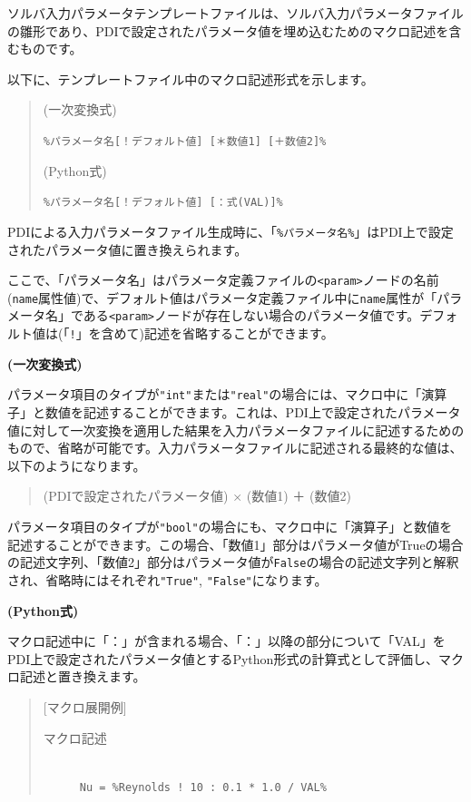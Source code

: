 \documentclass[a4paper,11pt]{jarticle}
\begin{document}
{ソルバ入力パラメータテンプレートファイルは、ソルバ入力パラメータファイルの雛形であり、PDIで設定されたパラメータ値を埋め込むためのマクロ記述を含むものです。

以下に、テンプレートファイル中のマクロ記述形式を示します。

\begin{quote}
(一次変換式)

{\tt \%パラメータ名[！デフォルト値] [＊数値1] [＋数値2]\%}

\medskip
(Python式)

{\tt \%パラメータ名[！デフォルト値] [：式(VAL)]\%}
\end{quote}

PDIによる入力パラメータファイル生成時に、「{\tt \%パラメータ名\%}」はPDI上で設定されたパラメータ値に置き換えられます。

ここで、「パラメータ名」はパラメータ定義ファイルの\texttt{<param>}ノードの名前({\tt name}属性値)で、デフォルト値はパラメータ定義ファイル中に{\tt name}属性が「パラメータ名」である\texttt{<param>}ノードが存在しない場合のパラメータ値です。デフォルト値は(「{\tt !}」を含めて)記述を省略することができます。

\medskip
{\bf (一次変換式)}

パラメータ項目のタイプが\texttt{"int"}または\texttt{"real"}の場合には、マクロ中に「演算子」と数値を記述することができます。これは、PDI上で設定されたパラメータ値に対して一次変換を適用した結果を入力パラメータファイルに記述するためのもので、省略が可能です。入力パラメータファイルに記述される最終的な値は、以下のようになります。

\begin{quote}
(PDIで設定されたパラメータ値) × (数値1) ＋ (数値2)
\end{quote}

パラメータ項目のタイプが\texttt{"bool"}の場合にも、マクロ中に「演算子」と数値を記述することができます。この場合、「数値1」部分はパラメータ値がTrueの場合の記述文字列、「数値2」部分はパラメータ値が{\tt False}の場合の記述文字列と解釈され、省略時にはそれぞれ\texttt{"True"}, \texttt{"False"}になります。

\medskip
{\bf (Python式)}

マクロ記述中に「：」が含まれる場合、「：」以降の部分について「VAL」をPDI上で設定されたパラメータ値とするPython形式の計算式として評価し、マクロ記述と置き換えます。

\begin{quote}
[マクロ展開例]

\begin{description}
\item[マクロ記述] {\ }\\
{\tt Nu = \%Reynolds ! 10 : 0.1 * 1.0 / VAL\%}


\end{description}
\end{quote}}
\end{document}
